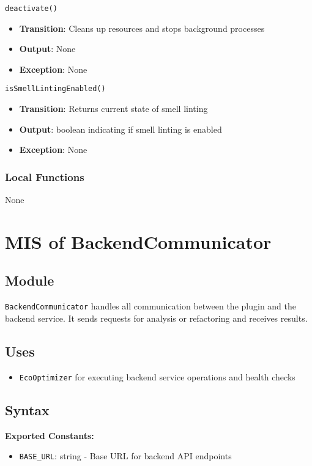 \documentclass[12pt, titlepage]{article}
\begin{document}
\noindent\texttt{deactivate()}
\begin{itemize}
    \item \textbf{Transition}: Cleans up resources and stops background processes
    \item \textbf{Output}: None
    \item \textbf{Exception}: None
\end{itemize}

\noindent\texttt{isSmellLintingEnabled()}
\begin{itemize}
    \item \textbf{Transition}: Returns current state of smell linting
    \item \textbf{Output}: boolean indicating if smell linting is enabled
    \item \textbf{Exception}: None
\end{itemize}

\subsubsection{Local Functions}
None

\section{MIS of BackendCommunicator}

\subsection{Module}
\texttt{BackendCommunicator} handles all communication between the plugin and the backend service. It sends requests for analysis or refactoring and receives results.

\subsection{Uses}
\begin{itemize}
    \item \texttt{EcoOptimizer} for executing backend service operations and health checks
\end{itemize}

\subsection{Syntax}

\textbf{Exported Constants:} 
\begin{itemize}
    \item \texttt{BASE\_URL}: string - Base URL for backend API endpoints
\end{itemize}
\end{document}
